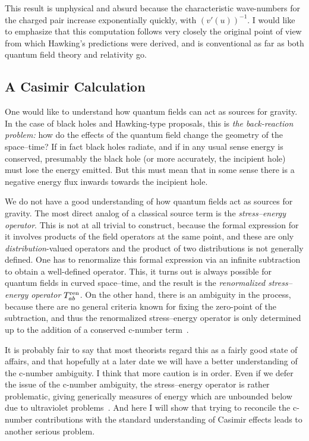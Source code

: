 \documentclass[
%
draft    %
,numberedheadings 
,bibliocites
  ]
  {aipproc}
\begin{document}
This result is unphysical and absurd because the characteristic wave-numbers for the charged pair increase exponentially quickly, with $(v'(u))^{-1}$.  
I would like to emphasize that this computation follows very closely the original point of view from which Hawking's predictions were derived, and is conventional as far as both quantum field theory and relativity go.  

\subsection{A Casimir Calculation}

One would like to understand how quantum fields can act as sources for gravity.  In the case of black holes and Hawking-type proposals, this is {\em the back-reaction problem:}  how do the effects of the quantum field change the geometry of the space--time?  If in fact black holes radiate, and if in any usual sense energy is conserved, presumably the black hole (or more accurately, the incipient hole) must lose the energy emitted.  But this must mean that in some sense there is a negative energy flux inwards towards the incipient hole.

We do not have a good understanding of how quantum fields act as sources for gravity.
The most direct analog of a classical source term is the {\em stress--energy operator}.  This is not at all trivial to construct, because the formal expression for it involves products of the field operators at the same point, and these are only {\em distribution}-valued operators and the product of two distributions is not generally defined.  One has to renormalize this formal expression via an infinite subtraction to obtain a well-defined operator.  This, it turns out is always possible for quantum fields in curved space--time, and the result is the {\em renormalized stress--energy operator} $T^{\rm ren}_{ab}$.
On the other hand, there is an ambiguity in the process, because there are no general criteria known for fixing the zero-point of the subtraction, and thus the renormalized stress--energy operator is only determined up to the addition of a conserved c-number term~\citep{Wald:1995yp}.

It is probably fair to say that most theorists regard this as a fairly good state of affairs, and that hopefully at a later date we will have a better understanding of the c-number ambiguity.  I think that more caution is in order.  Even if we defer the issue of the c-number ambiguity, the stress--energy operator is rather problematic, giving generically measures of energy which are unbounded below due to ultraviolet problems~\citep{Helfer:1996my}.  And here I will show that trying to reconcile the c-number contributions with the standard understanding of Casimir effects leads to another serious problem.
\end{document}
